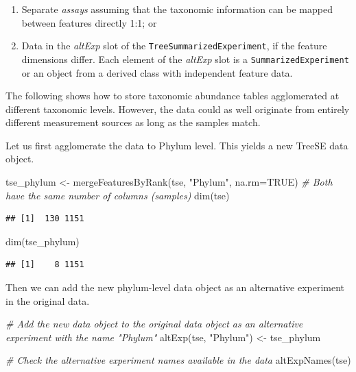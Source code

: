 \documentclass[
]{book}
\newenvironment{Shaded}{\begin{snugshade}}{\end{snugshade}}
\newcommand{\AttributeTok}[1]{\textcolor[rgb]{0.77,0.63,0.00}{#1}}
\newcommand{\CommentTok}[1]{\textcolor[rgb]{0.56,0.35,0.01}{\textit{#1}}}
\newcommand{\ConstantTok}[1]{\textcolor[rgb]{0.00,0.00,0.00}{#1}}
\newcommand{\FunctionTok}[1]{\textcolor[rgb]{0.00,0.00,0.00}{#1}}
\newcommand{\NormalTok}[1]{#1}
\newcommand{\OtherTok}[1]{\textcolor[rgb]{0.56,0.35,0.01}{#1}}
\newcommand{\StringTok}[1]{\textcolor[rgb]{0.31,0.60,0.02}{#1}}
\providecommand{\tightlist}{%
  \setlength{\itemsep}{0pt}\setlength{\parskip}{0pt}}
\begin{document}
\begin{enumerate}
\def\labelenumi{\arabic{enumi}.}
\tightlist
\item
  Separate \emph{assays} assuming that the taxonomic information can be mapped
  between features directly 1:1; or
\item
  Data in the \emph{altExp} slot of the \texttt{TreeSummarizedExperiment}, if the feature
  dimensions differ. Each element of the \emph{altExp} slot is a \texttt{SummarizedExperiment}
  or an object from a derived class with independent feature data.
\end{enumerate}

The following shows how to store taxonomic abundance tables
agglomerated at different taxonomic levels. However, the data could as
well originate from entirely different measurement sources as long as
the samples match.

Let us first agglomerate the data to Phylum level. This yields a new
TreeSE data object.

\begin{Shaded}
\begin{Highlighting}[]
\NormalTok{tse\_phylum }\OtherTok{\textless{}{-}} \FunctionTok{mergeFeaturesByRank}\NormalTok{(tse, }\StringTok{"Phylum"}\NormalTok{, }\AttributeTok{na.rm=}\ConstantTok{TRUE}\NormalTok{)}
\CommentTok{\# Both have the same number of columns (samples)}
\FunctionTok{dim}\NormalTok{(tse)}
\end{Highlighting}
\end{Shaded}

\begin{verbatim}
## [1]  130 1151
\end{verbatim}

\begin{Shaded}
\begin{Highlighting}[]
\FunctionTok{dim}\NormalTok{(tse\_phylum)}
\end{Highlighting}
\end{Shaded}

\begin{verbatim}
## [1]    8 1151
\end{verbatim}

Then we can add the new phylum-level data object as an alternative experiment in the original data.

\begin{Shaded}
\begin{Highlighting}[]
\CommentTok{\# Add the new data object to the original data object as an alternative experiment with the name "Phylum"}
\FunctionTok{altExp}\NormalTok{(tse, }\StringTok{"Phylum"}\NormalTok{) }\OtherTok{\textless{}{-}}\NormalTok{ tse\_phylum}

\CommentTok{\# Check the alternative experiment names available in the data}
\FunctionTok{altExpNames}\NormalTok{(tse)}
\end{Highlighting}
\end{Shaded}
\end{document}
